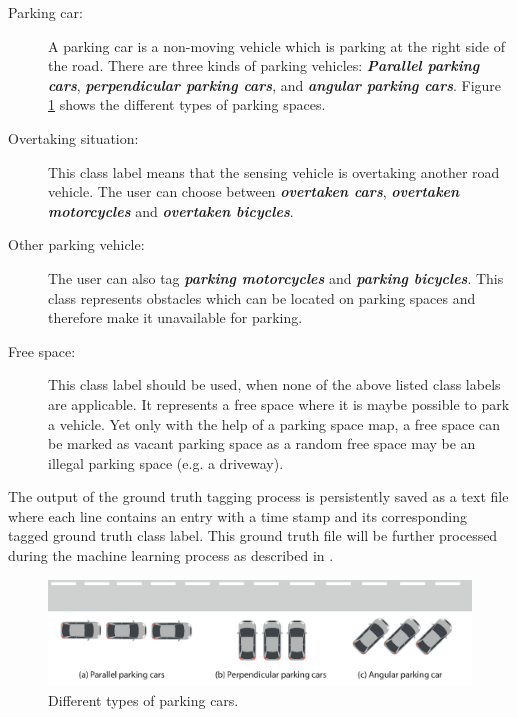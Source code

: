\begin{description}

\item[Parking car:] A parking car is a non-moving vehicle which is parking at the right side of the road. There are three kinds of parking vehicles: \textbf{\textit{Parallel parking cars}}, \textbf{\textit{perpendicular parking cars}}, and \textbf{\textit{angular parking cars}}. Figure \ref{fig:types_of_parking_cars} shows the different types of parking spaces.

\item[Overtaking situation:] This class label means that the sensing vehicle is overtaking another road vehicle. The user can choose between \textbf{\textit{overtaken cars}}, \textbf{\textit{overtaken motorcycles}} and \textbf{\textit{overtaken bicycles}}.

\item[Other parking vehicle:] The user can also tag \textbf{\textit{parking motorcycles}} and \textbf{\textit{parking bicycles}}. This class represents obstacles which can be located on parking spaces and therefore make it unavailable for parking.

\item[Free space:] This class label should be used, when none of the above listed class labels are applicable. It represents a free space where it is maybe possible to park a vehicle. Yet only with the help of a parking space map, a free space can be marked as vacant parking space as a random free space may be an illegal parking space (e.g. a driveway).

\end{description}



The output of the ground truth tagging process is persistently saved as a text file where each line contains an entry with a time stamp and its corresponding tagged ground truth class label. This ground truth file will be further processed during the machine learning process as described in .


\begin{figure}
	\centering
	\includegraphics[width=\textwidth]{img/types-of-parking-cars.eps}
	\caption{Different types of parking cars.}
	\label{fig:types_of_parking_cars}
\end{figure}


